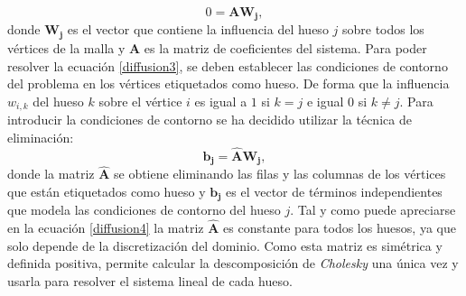 \begin{equation}
\label{diffusion3}
 0 =  \mathbf{A} \mathbf{W_j},
\end{equation}
donde $\mathbf{W_j}$ es el vector que contiene la influencia del hueso $j$ sobre todos los vértices de la malla y $\mathbf{A}$ es la matriz de coeficientes del sistema. 
Para poder resolver la ecuación \ref{diffusion3}, se deben establecer las condiciones de contorno del problema en los vértices etiquetados como hueso. De forma que la influencia $w_{i,k}$ del hueso $k$ sobre el vértice $i$ es igual a $1$ si $k=j$ e igual 0 si
$k \neq j$. Para introducir la condiciones de contorno se ha decidido utilizar la técnica de eliminación: 
\begin{equation}
\label{diffusion4}
 \mathbf{b_j} =  \mathbf{\hat{A}} \mathbf{W_j},
\end{equation}
donde la matriz $\mathbf{\hat{A}}$ se obtiene eliminando las filas y las columnas de los vértices que están etiquetados como hueso y  $\mathbf{b_j}$ es el vector de términos independientes que modela las condiciones de contorno del hueso $j$. Tal y como puede apreciarse en la ecuación \ref{diffusion4} la matriz $\mathbf{\hat{A}}$ es constante para todos los huesos, ya que solo depende de la discretización del dominio. Como esta matriz es simétrica y definida positiva, permite calcular la descomposición de \emph{Cholesky} una única vez y usarla para resolver el sistema lineal de cada hueso.






%


